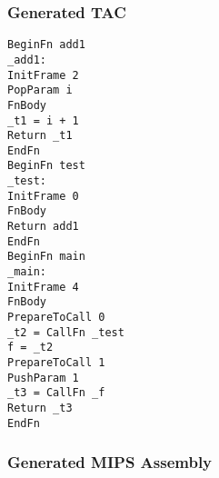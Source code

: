 \subsubsection{Generated TAC}
\begin{lstlisting}[showstringspaces=false,breaklines=true,backgroundcolor=\color{light-gray}, captionpos=b]
BeginFn add1
_add1:
InitFrame 2
PopParam i
FnBody
_t1 = i + 1
Return _t1
EndFn
BeginFn test
_test:
InitFrame 0
FnBody
Return add1
EndFn
BeginFn main
_main:
InitFrame 4
FnBody
PrepareToCall 0
_t2 = CallFn _test
f = _t2
PrepareToCall 1
PushParam 1
_t3 = CallFn _f
Return _t3
EndFn

\end{lstlisting}\subsubsection{Generated MIPS Assembly}
